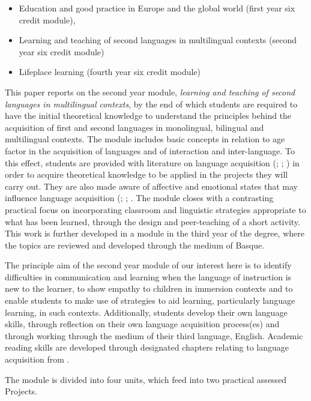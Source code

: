 \documentclass[output=paper]{../langscibook}
\begin{document}
\begin{itemize}
\item Education and good practice in Europe and the global world (first year six credit module), 
\item Learning and teaching of second languages in multilingual contexts (second year six credit module) 
\item Lifeplace learning (fourth year six credit module) 
\end{itemize}

This paper reports on the second year module, \emph{learning and teaching of second languages in multilingual contexts}, by the end of which students are required to have the initial theoretical knowledge to understand the principles behind the acquisition of first and second languages in monolingual, bilingual and multilingual contexts. The module includes basic concepts in relation to age factor in the acquisition of languages and of interaction and inter-language. To this effect, students are provided with literature on language acquisition (\citealt{Genesee1994}; \citealt{LightbownSpada2013}; \citealt{Palenham2004}) in order to acquire theoretical knowledge to be applied in the projects they will carry out. They are also made aware of affective and emotional states that may influence language acquisition (\citealt{Barnes2006}; \citealt{DeHouwer2009,DeHouwer2009b}; \citealt{Dewaele2013}. The module closes with a contrasting practical focus on incorporating classroom and linguistic strategies appropriate to what has been learned, through the design and peer-teaching of a short activity. This work is further developed in a module in the third year of the degree, where the topics are reviewed and developed through the medium of Basque.

The principle aim of the second year module of our interest here is to identify difficulties in communication and learning when the language of instruction is new to the learner, to show empathy to children in immersion contexts and to enable students to make use of strategies to aid learning, particularly language learning, in such contexts. Additionally, students develop their own language skills, through reflection on their own language acquisition process(es) and through working through the medium of their third language, English. Academic reading skills are developed through designated chapters relating to language acquisition from \citet{Palenham2004}.

The module is divided into four units, which feed into two practical assessed Projects.
\end{document}

